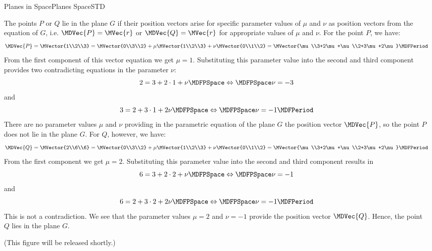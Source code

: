 \begin{MXContent}{Planes in Space}{Planes Space}{STD}
\begin{MExample}
\begin{itemize}
 The points $P$ or $Q$ lie in the plane $G$ if their position vectors arise for specific parameter values of 
 $\mu$ and $\nu$ as position vectors from the equation of $G$, i.e. $\MDVec{P}=\MVec{r}$ or $\MDVec{Q}=\MVec{r}$
 for appropriate values of $\mu$ and $\nu$. For the point $P$, we have:
 \[
  \MDVec{P}=\MVector{1\\2\\3}=\MVector{0\\3\\2}+\mu\MVector{1\\2\\3}+\nu\MVector{0\\1\\2}=\MVector{\mu\\3+2\mu+\nu\\2+3\mu+2\nu}\MDFPeriod
 \]
 From the first component of this vector equation we get $\mu=1$. Substituting this parameter value into 
 the second and third component provides two contradicting equations in the parameter $\nu$:
 \[
  2=3+2\cdot 1+\nu\MDFPSpace\Leftrightarrow\MDFPSpace\nu=-3
 \]
 and
 \[
  3=2+3\cdot 1+2\nu\MDFPSpace\Leftrightarrow\MDFPSpace\nu=-1\MDFPeriod 
 \]
 There are no parameter values $\mu$ and $\nu$ providing in the parametric equation of the plane 
 $G$ the position vector $\MDVec{P}$, so the point $P$ does not lie in the plane $G$.  
 For $Q$, however, we have:
 \[
  \MDVec{Q}=\MVector{2\\6\\6}=\MVector{0\\3\\2}+\mu\MVector{1\\2\\3}+\nu\MVector{0\\1\\2}=\MVector{\mu\\3+2\mu+\nu\\2+3\mu+2\nu}\MDFPeriod
 \]
 From the first component we get $\mu=2$. Substituting this parameter value into the second and third component
 results in
 \[
  6=3+2\cdot 2+\nu\MDFPSpace\Leftrightarrow\MDFPSpace\nu=-1
 \]
 and
 \[
  6=2+3\cdot 2+2\nu\MDFPSpace\Leftrightarrow\MDFPSpace\nu=-1\MDFPeriod
 \]
 This is not a contradiction. We see that the parameter values $\mu=2$ and $\nu=-1$ provide the position 
 vector $\MDVec{Q}$. Hence, the point $Q$ lies in the plane $G$.
 
 (This figure will be released shortly.)
 
\end{itemize}
\end{MExample}


\end{MXContent}

